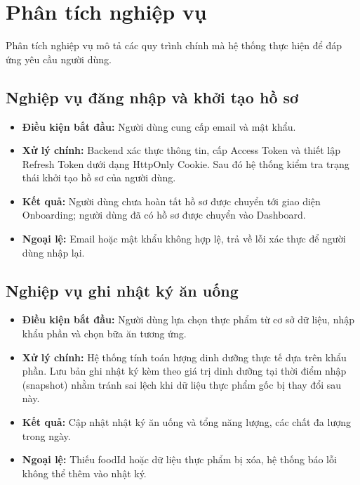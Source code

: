 \documentclass[12pt, a4paper]{report}
\begin{document}
\section{Phân tích nghiệp vụ}
Phân tích nghiệp vụ mô tả các quy trình chính mà hệ thống thực hiện để đáp ứng yêu cầu người dùng.

\subsection{Nghiệp vụ đăng nhập và khởi tạo hồ sơ}
\begin{itemize}
    \item \textbf{Điều kiện bắt đầu:} Người dùng cung cấp email và mật khẩu.
    \item \textbf{Xử lý chính:} Backend xác thực thông tin, cấp Access Token và thiết lập Refresh Token dưới dạng HttpOnly Cookie. Sau đó hệ thống kiểm tra trạng thái khởi tạo hồ sơ của người dùng.
    \item \textbf{Kết quả:} Người dùng chưa hoàn tất hồ sơ được chuyển tới giao diện Onboarding; người dùng đã có hồ sơ được chuyển vào Dashboard.
    \item \textbf{Ngoại lệ:} Email hoặc mật khẩu không hợp lệ, trả về lỗi xác thực để người dùng nhập lại.
\end{itemize}

\subsection{Nghiệp vụ ghi nhật ký ăn uống}
\begin{itemize}
    \item \textbf{Điều kiện bắt đầu:} Người dùng lựa chọn thực phẩm từ cơ sở dữ liệu, nhập khẩu phần và chọn bữa ăn tương ứng.
    \item \textbf{Xử lý chính:} Hệ thống tính toán lượng dinh dưỡng thực tế dựa trên khẩu phần. Lưu bản ghi nhật ký kèm theo giá trị dinh dưỡng tại thời điểm nhập (snapshot) nhằm tránh sai lệch khi dữ liệu thực phẩm gốc bị thay đổi sau này.
    \item \textbf{Kết quả:} Cập nhật nhật ký ăn uống và tổng năng lượng, các chất đa lượng trong ngày.
    \item \textbf{Ngoại lệ:} Thiếu foodId hoặc dữ liệu thực phẩm bị xóa, hệ thống báo lỗi không thể thêm vào nhật ký.
\end{itemize}
\end{document}
